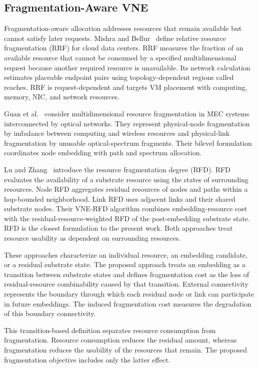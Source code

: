 \documentclass{ieeeaccess}
\begin{document}
\subsection{Fragmentation-Aware VNE}

Fragmentation-aware allocation addresses resources that remain available but cannot satisfy later
requests. Mishra and Bellur~\cite{mishra2016fragmenting} define relative resource fragmentation
(RRF) for cloud data centers. RRF measures the fraction of an available resource that cannot be
consumed by a specified multidimensional request because another required resource is unavailable.
Its network calculation estimates placeable endpoint pairs using topology-dependent regions called
reaches. RRF is request-dependent and targets VM placement with computing, memory, NIC, and network
resources.

Guan et al.~\cite{guan2023multidimensional} consider multidimensional resource fragmentation in MEC
systems interconnected by optical networks. They represent physical-node fragmentation by
imbalance between computing and wireless resources and physical-link fragmentation by unusable
optical-spectrum fragments. Their bilevel formulation coordinates node embedding with path and
spectrum allocation.

Lu and Zhang~\cite{lu2022resource} introduce the resource fragmentation degree (RFD). RFD evaluates
the availability of a substrate resource using the states of surrounding resources. Node RFD
aggregates residual resources of nodes and paths within a hop-bounded neighborhood. Link RFD uses
adjacent links and their shared substrate nodes. Their VNE-RFD algorithm combines embedding-resource
cost with the residual-resource-weighted RFD of the post-embedding substrate state. RFD is the
closest formulation to the present work. Both approaches treat resource usability as dependent on
surrounding resources.

These approaches characterize an individual resource, an embedding candidate, or a residual
substrate state. The proposed approach treats an embedding as a transition between substrate states
and defines fragmentation cost as the loss of residual-resource combinability caused by that
transition. External connectivity represents the boundary through which each residual node or link
can participate in future embeddings. The induced fragmentation cost measures the degradation of
this boundary connectivity.

This transition-based definition separates resource consumption from fragmentation. Resource
consumption reduces the residual amount, whereas fragmentation reduces the usability of the
resources that remain. The proposed fragmentation objective includes only the latter effect.
\end{document}
